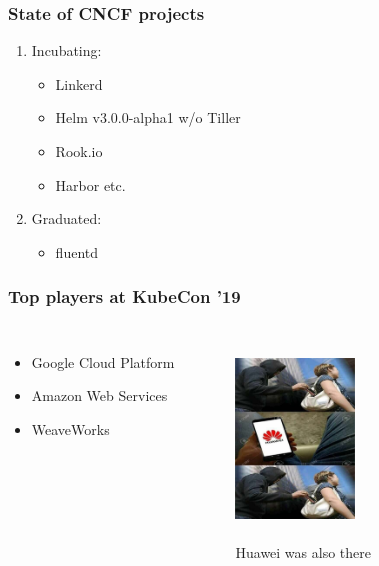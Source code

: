 \documentclass[default]{beamer}
\begin{document}
\begin{frame}
  \frametitle{State of CNCF projects}\footnotemark
  \begin{enumerate}
    \item Incubating:
    \begin{itemize}
      \item Linkerd
      \item Helm v3.0.0-alpha1 w/o Tiller
      \item Rook.io
      \item Harbor etc.
    \end{itemize}
    \item Graduated:
    \begin{itemize}
      \item fluentd
    \end{itemize}
  \end{enumerate}
\end{frame}

\begin{frame}
  \frametitle{Top players at KubeCon '19}   %
  \begin{columns}[c]
    \column{2in}
      \begin{itemize}
        \item Google Cloud Platform
        \item Amazon Web Services
        \item WeaveWorks
      \end{itemize}
    \column{2in}
    \begin{figure}
      \includegraphics[width=90pt,height=150pt]{src/kubecon/static/img01.jpeg}
      \caption{Huawei was also there}
    \end{figure}
  \end{columns}
\end{frame}
\end{document}
